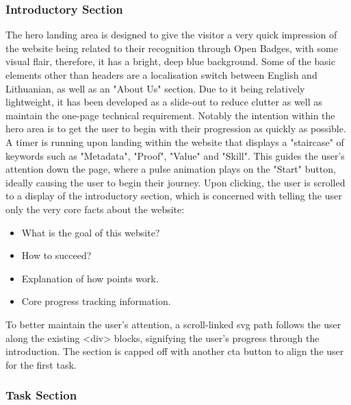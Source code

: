 \subsubsection{Introductory Section}
The hero landing area is designed to give the visitor a very quick impression of the website being related to their recognition through Open Badges, with some visual flair, therefore, it has a bright, deep blue background. 
Some of the basic elements other than headers are a localisation switch between English and Lithuanian, as well as an "About Us" section. 
Due to it being relatively lightweight, it has been developed as a slide-out to reduce clutter as well as maintain the one-page technical requirement. 
Notably the intention within the hero area is to get the user to begin with their progression as quickly as possible. 
A timer is running upon landing within the website that displays a "staircase" of keywords such as "Metadata", "Proof", "Value" and "Skill". 
This guides the user's attention down the page, where a pulse animation plays on the "Start" button, ideally causing the user to begin their journey. 
Upon clicking, the user is scrolled to a display of the introductory section, which is concerned with telling the user only the very core facts about the website:

\begin{itemize}
    \item What is the goal of this website?
    \item How to succeed?
    \item Explanation of how points work.
    \item Core progress tracking information.
\end{itemize}

To better maintain the user's attention, a scroll-linked \acrshort{svg} path follows the user along the existing <div> blocks, signifying the user's progress through the introduction. 
The section is capped off with another \acrshort{cta} button to align the user for the first task.

\subsubsection{Task Section}

